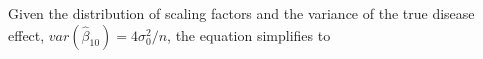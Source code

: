 Given the distribution of scaling factors and the variance of the true disease effect, $var(\hat{\beta}_{10}) = 4\sigma_0^2/n$, the equation simplifies to
